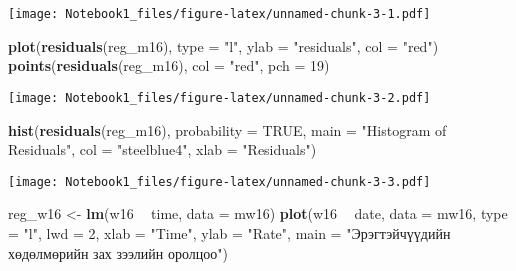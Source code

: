 \documentclass[]{article}
\newenvironment{Shaded}{\begin{snugshade}}{\end{snugshade}}
\newcommand{\DataTypeTok}[1]{\textcolor[rgb]{0.13,0.29,0.53}{#1}}
\newcommand{\DecValTok}[1]{\textcolor[rgb]{0.00,0.00,0.81}{#1}}
\newcommand{\KeywordTok}[1]{\textcolor[rgb]{0.13,0.29,0.53}{\textbf{#1}}}
\newcommand{\NormalTok}[1]{#1}
\newcommand{\OperatorTok}[1]{\textcolor[rgb]{0.81,0.36,0.00}{\textbf{#1}}}
\newcommand{\OtherTok}[1]{\textcolor[rgb]{0.56,0.35,0.01}{#1}}
\newcommand{\StringTok}[1]{\textcolor[rgb]{0.31,0.60,0.02}{#1}}
\begin{document}
\begin{Shaded}
\end{Shaded}

\texttt{[image: Notebook1\_files/figure-latex/unnamed-chunk-3-1.pdf]}

\begin{Shaded}
\begin{Highlighting}[]
\KeywordTok{plot}\NormalTok{(}\KeywordTok{residuals}\NormalTok{(reg_m16), }
     \DataTypeTok{type =} \StringTok{"l"}\NormalTok{, }
     \DataTypeTok{ylab =} \StringTok{"residuals"}\NormalTok{,}
     \DataTypeTok{col  =} \StringTok{"red"}\NormalTok{)}
\KeywordTok{points}\NormalTok{(}\KeywordTok{residuals}\NormalTok{(reg_m16), }\DataTypeTok{col =} \StringTok{"red"}\NormalTok{, }\DataTypeTok{pch =} \DecValTok{19}\NormalTok{)}
\end{Highlighting}
\end{Shaded}

\texttt{[image: Notebook1\_files/figure-latex/unnamed-chunk-3-2.pdf]}

\begin{Shaded}
\begin{Highlighting}[]
\KeywordTok{hist}\NormalTok{(}\KeywordTok{residuals}\NormalTok{(reg_m16), }\DataTypeTok{probability =} \OtherTok{TRUE}\NormalTok{, }
     \DataTypeTok{main =} \StringTok{"Histogram of Residuals"}\NormalTok{, }
     \DataTypeTok{col  =} \StringTok{"steelblue4"}\NormalTok{, }
     \DataTypeTok{xlab =} \StringTok{"Residuals"}\NormalTok{)}
\end{Highlighting}
\end{Shaded}

\texttt{[image: Notebook1\_files/figure-latex/unnamed-chunk-3-3.pdf]}

\begin{Shaded}
\begin{Highlighting}[]
\NormalTok{reg_w16 <-}\StringTok{ }\KeywordTok{lm}\NormalTok{(w16 }\OperatorTok{~}\StringTok{ }\NormalTok{time, }\DataTypeTok{data =}\NormalTok{ mw16)}
\KeywordTok{plot}\NormalTok{(w16 }\OperatorTok{~}\StringTok{ }\NormalTok{date, }\DataTypeTok{data =}\NormalTok{ mw16, }
     \DataTypeTok{type =} \StringTok{"l"}\NormalTok{, }
     \DataTypeTok{lwd  =} \DecValTok{2}\NormalTok{, }
     \DataTypeTok{xlab =} \StringTok{"Time"}\NormalTok{, }
     \DataTypeTok{ylab =} \StringTok{"Rate"}\NormalTok{, }
     \DataTypeTok{main =} \StringTok{"Эрэгтэйчүүдийн хөдөлмөрийн зах зээлийн оролцоо"}\NormalTok{)}
\end{Highlighting}
\end{Shaded}
\end{document}
